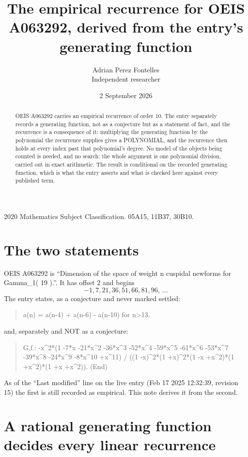 \documentclass[11pt,a4paper]{article}
\title{The empirical recurrence for OEIS A063292, derived from the entry's generating function}
\author{Adrian Perez Fontelles\\ \small Independent researcher}
\date{2 September 2026}
\theoremstyle{plain}
\theoremstyle{definition}
\begin{document}
\maketitle

\begin{abstract}
OEIS A063292 carries an empirical recurrence of order $10$. The entry separately records a
generating function, not as a conjecture but as a statement of fact, and the recurrence is a
consequence of it: multiplying the generating function by the polynomial the recurrence
supplies gives a POLYNOMIAL, and the recurrence then holds at every index past that
polynomial's degree. No model of the objects being counted is needed, and no search: the
whole argument is one polynomial division, carried out in exact arithmetic. The result is
conditional on the recorded generating function, which is what the entry asserts and what is
checked here against every published term.
\end{abstract}

\noindent\small 2020 Mathematics Subject Classification. 05A15, 11B37, 30B10.\normalsize

\section{The two statements}

OEIS A063292 is ``Dimension of the space of weight n cuspidal newforms for Gamma\_1( 19 ).''. It has offset $2$ and begins
\[
-1, 7, 21, 36, 51, 66, 81, 96,\ \dots
\]
The entry states, as a conjecture and never marked settled:
\begin{quote}
a(n) = a(n-4) + a(n-6) - a(n-10) for n>13.
\end{quote}
and, separately and NOT as a conjecture:
\begin{quote}
G.f.: -x\^{}2*(1 -7*x -21*x\^{}2 -36*x\^{}3 -52*x\^{}4 -59*x\^{}5 -61*x\^{}6 -53*x\^{}7 -39*x\^{}8 -24*x\^{}9 -8*x\^{}10 +x\^{}11) / ((1 -x)\^{}2*(1 +x)\^{}2*(1 -x +x\^{}2)*(1 +x\^{}2)*(1 +x +x\^{}2)). (End)
\end{quote}
As of the ``Last modified'' line on the live entry (Feb 17 2025 12:32:39, revision 15) the first is still
recorded as empirical. This note derives it from the second.

\section{A rational generating function decides every linear recurrence}
\end{document}
